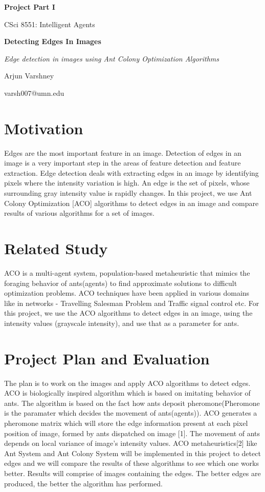 \documentclass[11pt]{article}
\begin{document}
\thispagestyle{empty}

\centerline{\textbf{\Large{Project Part I}}}
\centerline{CSci 8551: Intelligent Agents}
\bigskip
\bigskip
\centerline{\textbf{\Large{Detecting Edges In Images}}}
\centerline{\it{\Large{Edge detection in images using Ant Colony Optimization Algorithms}}}
\bigskip
\centerline{\Large{Arjun Varshney}}
\centerline{varsh007@umn.edu}

\section*{Motivation} 
Edges are the most important feature in an image. Detection of edges in an image is a very important step in the areas of feature detection and feature extraction. Edge detection deals with extracting edges in an image by identifying pixels where the intensity variation is high. An edge is the set of pixels, whose surrounding gray intensity value is rapidly changes. In this project, we use Ant Colony Optimization [ACO] algorithms to detect edges in an image and compare results of various algorithms for a set of images.  

\section*{Related Study}
ACO is a multi-agent system, population-based metaheuristic that mimics the foraging behavior of ants(agents) to find approximate solutions to difficult optimization problems. ACO techniques have been applied in various domains like in networks - Travelling Salesman Problem and Traffic signal control etc. For this project, we use the ACO algorithms to detect edges in an image, using the intensity values (grayscale intensity), and use that as a parameter for ants.

\section*{Project Plan and Evaluation}
The plan is to work on the images and apply ACO algorithms to detect edges. ACO is biologically inspired algorithm which is based on imitating behavior of ants. The algorithm is based on the fact how ants deposit pheromone(Pheromone is the paramater which decides the movement of ants(agents)). ACO generates a pheromone matrix which will store the edge information present at each pixel position of image, formed by ants dispatched on image [1]. The movement of ants depends on local variance of image's intensity values. ACO metaheuristics[2] like Ant System and Ant Colony System will be  implemented in this project to detect edges and we will compare the results of these algorithms to see which one works better. Results will comprise of images containing the edges. The better edges are produced, the better the algorithm has performed.  
	
\end{document}
